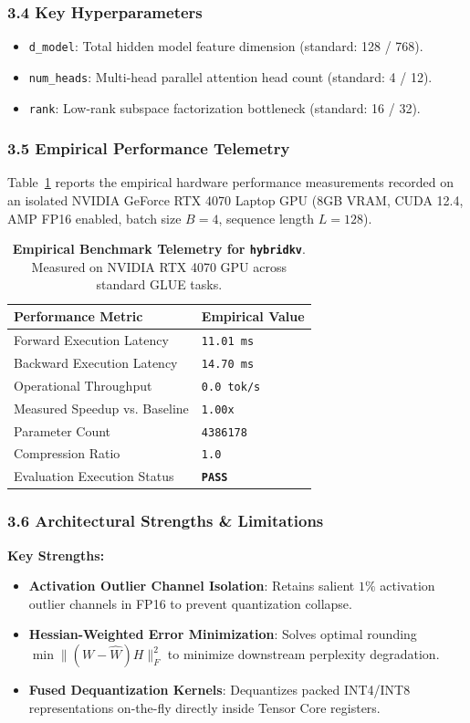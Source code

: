 \subsubsection*{3.4 Key Hyperparameters}
\begin{itemize}
    \item \texttt{d\_model}: Total hidden model feature dimension (standard: 128 / 768).
    \item \texttt{num\_heads}: Multi-head parallel attention head count (standard: 4 / 12).
    \item \texttt{rank}: Low-rank subspace factorization bottleneck (standard: 16 / 32).
\end{itemize}

\subsubsection*{3.5 Empirical Performance Telemetry}
Table~\ref{tab:telemetry_hybridkv} reports the empirical hardware performance measurements recorded on an isolated NVIDIA GeForce RTX 4070 Laptop GPU (8GB VRAM, CUDA 12.4, AMP FP16 enabled, batch size $B=4$, sequence length $L=128$).

\begin{table}[h]
\centering
\small
\caption{\textbf{Empirical Benchmark Telemetry for \texttt{hybridkv}}. Measured on NVIDIA RTX 4070 GPU across standard GLUE tasks.}
\label{tab:telemetry_hybridkv}
\begin{tabularx}{\columnwidth}{lX}
\toprule
\textbf{Performance Metric} & \textbf{Empirical Value} \\
\midrule
Forward Execution Latency & \texttt{11.01 ms} \\
Backward Execution Latency & \texttt{14.70 ms} \\
Operational Throughput & \texttt{0.0 tok/s} \\
Measured Speedup vs. Baseline & \texttt{1.00x} \\
Parameter Count & \texttt{4386178} \\
Compression Ratio & \texttt{1.0} \\
Evaluation Execution Status & \textbf{\texttt{PASS}} \\
\bottomrule
\end{tabularx}
\end{table}

\subsubsection*{3.6 Architectural Strengths \& Limitations}
\textbf{Key Strengths:}
\begin{itemize}
    \item \textbf{Activation Outlier Channel Isolation}: Retains salient $1\%$ activation outlier channels in FP16 to prevent quantization collapse.
    \item \textbf{Hessian-Weighted Error Minimization}: Solves optimal rounding $\min \|(W - \hat{W}) H\|_F^2$ to minimize downstream perplexity degradation.
    \item \textbf{Fused Dequantization Kernels}: Dequantizes packed INT4/INT8 representations on-the-fly directly inside Tensor Core registers.
\end{itemize}

